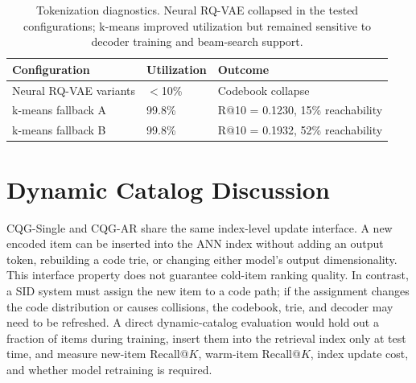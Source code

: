 \documentclass[letterpaper]{article}
\begin{document}
\begin{table}[H]
\centering
\small
\begin{tabular}{lll}
\toprule
Configuration & Utilization & Outcome \\
\midrule
Neural RQ-VAE variants & \(<\)10\% & Codebook collapse \\
k-means fallback A & 99.8\% & R@10 = 0.1230, 15\% reachability \\
k-means fallback B & 99.8\% & R@10 = 0.1932, 52\% reachability \\
\bottomrule
\end{tabular}
\caption{Tokenization diagnostics. Neural RQ-VAE collapsed in the tested configurations; k-means improved utilization but remained sensitive to decoder training and beam-search support.}
\label{tab:tokenization}
\end{table}

\section{Dynamic Catalog Discussion}
\label{app:dynamic}

CQG-Single and CQG-AR share the same index-level update interface. A new encoded item can be inserted into the ANN index without adding an output token, rebuilding a code trie, or changing either model's output dimensionality. This interface property does not guarantee cold-item ranking quality. In contrast, a SID system must assign the new item to a code path; if the assignment changes the code distribution or causes collisions, the codebook, trie, and decoder may need to be refreshed. A direct dynamic-catalog evaluation would hold out a fraction of items during training, insert them into the retrieval index only at test time, and measure new-item Recall@$K$, warm-item Recall@$K$, index update cost, and whether model retraining is required.
\end{document}
